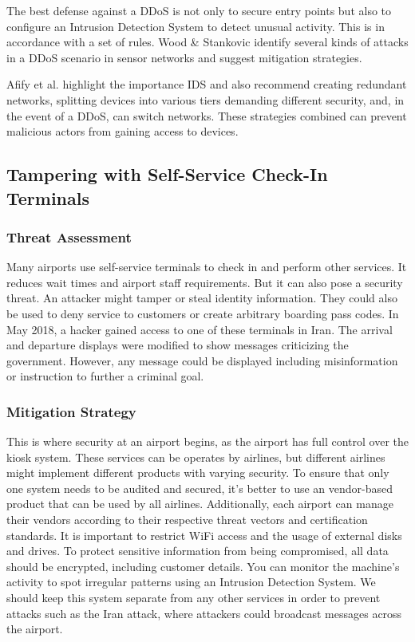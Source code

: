 The best defense against a DDoS is not only to secure entry points but also to configure an Intrusion Detection System to detect unusual activity. This is in accordance with a set of rules. Wood \& Stankovic \cite{wood_stankovic_2002} identify several kinds of attacks in a DDoS scenario in sensor networks and suggest mitigation strategies.

Afify et al. \cite{mafify} highlight the importance IDS and also recommend creating redundant networks, splitting devices into various tiers demanding different security, and, in the event of a DDoS, can switch networks. These strategies combined can prevent malicious actors from gaining access to devices.

\subsection{Tampering with Self-Service Check-In Terminals}
\subsubsection{Threat Assessment}
Many airports use self-service terminals to check in and perform other services. It reduces wait times and airport staff requirements. But it can also pose a security threat. An attacker might tamper or steal identity information. They could also be used to deny service to customers or create arbitrary boarding pass codes. In May 2018, a hacker gained access to one of these terminals in Iran. \cite{toi} The arrival and departure displays were modified to show messages criticizing the government. However, any message could be displayed including misinformation or instruction to further a criminal goal.

\subsubsection{Mitigation Strategy}
This is where security at an airport begins, as the airport has full control over the kiosk system. These services can be operates by airlines, but different airlines might implement different products with varying security. To ensure that only one system needs to be audited and secured, it's better to use an vendor-based product that can be used by all airlines. Additionally, each airport can manage their vendors according to their respective threat vectors and certification standards. It is important to restrict WiFi access and the usage of external disks and drives. To protect sensitive information from being compromised, all data should be encrypted, including customer details. You can monitor the machine's activity to spot irregular patterns using an Intrusion Detection System. We should keep this system separate from any other services in order to prevent attacks such as the Iran attack, where attackers could broadcast messages across the airport.

